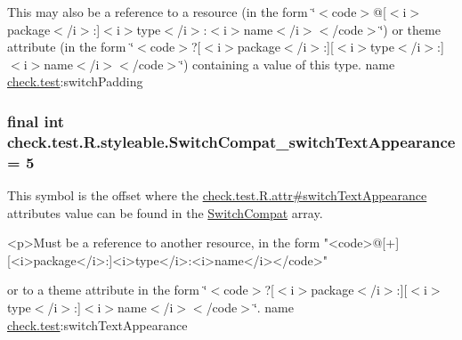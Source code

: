 This may also be a reference to a resource (in the form \char`\"{}$<$code$>$@\mbox{[}$<$i$>$package$<$/i$>$\+:\mbox{]}$<$i$>$type$<$/i$>$\+:$<$i$>$name$<$/i$>$$<$/code$>$\char`\"{}) or theme attribute (in the form \char`\"{}$<$code$>$?\mbox{[}$<$i$>$package$<$/i$>$\+:\mbox{]}\mbox{[}$<$i$>$type$<$/i$>$\+:\mbox{]}$<$i$>$name$<$/i$>$$<$/code$>$\char`\"{}) containing a value of this type.  name \hyperlink{namespacecheck_1_1test}{check.\+test}\+:switch\+Padding \hypertarget{classcheck_1_1test_1_1_r_1_1styleable_a89ea5d1aeeef77c9a3dad277bdab7d07}{}
\subsubsection[{Switch\+Compat\+\_\+switch\+Text\+Appearance}]{\setlength{\rightskip}{0pt plus 5cm}final int check.\+test.\+R.\+styleable.\+Switch\+Compat\+\_\+switch\+Text\+Appearance = 5\hspace{0.3cm}{\ttfamily [static]}}\label{classcheck_1_1test_1_1_r_1_1styleable_a89ea5d1aeeef77c9a3dad277bdab7d07}
This symbol is the offset where the \hyperlink{classcheck_1_1test_1_1_r_1_1attr_a208fa18b2eaf663f264d200f28ca74c2}{check.\+test.\+R.\+attr\#switch\+Text\+Appearance} attribute\textquotesingle{}s value can be found in the \hyperlink{classcheck_1_1test_1_1_r_1_1styleable_a0c8f3659ebec12826f8a2493fe43eaf4}{Switch\+Compat} array.

\begin{DoxyVerb}      <p>Must be a reference to another resource, in the form "<code>@[+][<i>package</i>:]<i>type</i>:<i>name</i></code>"
\end{DoxyVerb}
 or to a theme attribute in the form \char`\"{}$<$code$>$?\mbox{[}$<$i$>$package$<$/i$>$\+:\mbox{]}\mbox{[}$<$i$>$type$<$/i$>$\+:\mbox{]}$<$i$>$name$<$/i$>$$<$/code$>$\char`\"{}.  name \hyperlink{namespacecheck_1_1test}{check.\+test}\+:switch\+Text\+Appearance \hypertarget{classcheck_1_1test_1_1_r_1_1styleable_a95c824ebefc72184d7d92ae14058c7c4}{}
